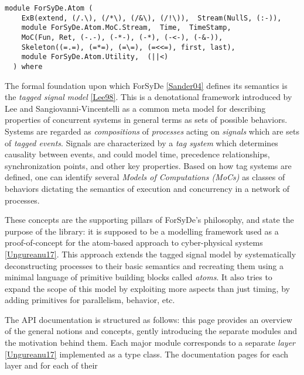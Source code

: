 \label{module:ForSyDe.Atom}
\haddockbeginheader
{\haddockverb\begin{verbatim}
module ForSyDe.Atom (
    ExB(extend, (/.\), (/*\), (/&\), (/!\)),  Stream(NullS, (:-)), 
    module ForSyDe.Atom.MoC.Stream,  Time,  TimeStamp, 
    MoC(Fun, Ret, (-.-), (-*-), (-*), (-<-), (-&-)), 
    Skeleton((=.=), (=*=), (=\=), (=<<=), first, last), 
    module ForSyDe.Atom.Utility,  (||<)
  ) where\end{verbatim}}
\haddockendheader

The formal foundation upon which ForSyDe \href{#sander04}{[Sander04]}
 defines its semantics is the \emph{tagged signal model}
 \href{ForSyDe-Atom.html#lee98}{[Lee98]}.  This is a denotational
 framework introduced by Lee and Sangiovanni-Vincentelli as a common
 meta model for describing properties of concurrent systems in
 general terms as sets of possible behaviors. Systems are regarded
 as \emph{compositions} of \emph{processes} acting on \emph{signals} which are sets
 of \emph{tagged events}. Signals are characterized by a \emph{tag system}
 which determines causality between events, and could model time,
 precedence relationships, synchronization points, and other key
 properties. Based on how tag systems are defined, one can identify
 several \emph{Models of Computations (MoCs)} as classes of behaviors
 dictating the semantics of execution and concurrency in a network
 of processes.\par
These concepts are the supporting pillars of ForSyDe's philosophy,
 and state the purpose of the  library: it is supposed
 to be a modelling framework used as a proof-of-concept for the
 atom-based approach to cyber-physical systems
 \href{ForSyDe-Atom.html#ungureanu17}{[Ungureanu17]}. This approach
 extends the tagged signal model by systematically deconstructing
 processes to their basic semantics and recreating them using a
 minimal language of primitive building blocks called \emph{atoms}. It
 also tries to expand the scope of this model by exploiting more
 aspects than just timing, by adding primitives for parallelism,
 behavior, etc.\par
The API documentation is structured as follows: this page provides
 an overview of the general notions and concepts, gently introducing
 the separate modules and the motivation behind them. Each major
 module corresponds to a separate \emph{layer}
 \href{ForSyDe-Atom.html#ungureanu17}{[Ungureanu17]} implemented as a type
 class. The documentation pages for each layer and for each of their
